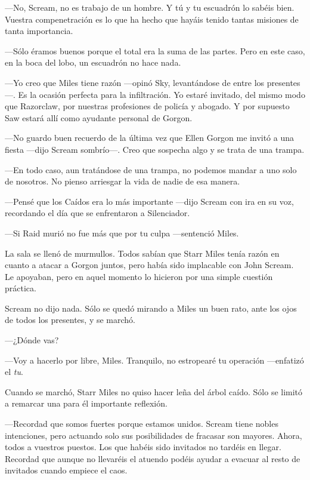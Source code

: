 ---No, Scream, no es trabajo de un hombre. Y tú y tu escuadrón lo sabéis bien. Vuestra compenetración es lo que ha hecho que hayáis tenido tantas misiones de tanta importancia.

---Sólo éramos buenos porque el total era la suma de las partes. Pero en este caso, en la boca del lobo, un escuadrón no hace nada.

---Yo creo que Miles tiene razón ---opinó Sky, levantándose de entre los presentes---. Es la ocasión perfecta para la infiltración. Yo estaré invitado, del mismo modo que Razorclaw, por nuestras profesiones de policía y abogado. Y por supuesto Saw estará allí como ayudante personal de Gorgon.

---No guardo buen recuerdo de la última vez que Ellen Gorgon me invitó a una fiesta ---dijo Scream sombrío---. Creo que sospecha algo y se trata de una trampa.

---En todo caso, aun tratándose de una trampa, no podemos mandar a uno solo de nosotros. No pienso arriesgar la vida de nadie de esa manera.

---Pensé que los Caídos era lo más importante ---dijo Scream con ira en su voz, recordando el día que se enfrentaron a Silenciador.

---Si Raid murió no fue más que por tu culpa ---sentenció Miles.

La sala se llenó de murmullos. Todos sabían que Starr Miles tenía razón en cuanto a atacar a Gorgon juntos, pero había sido implacable con John Scream. Le apoyaban, pero en aquel momento lo hicieron por una simple cuestión práctica.

Scream no dijo nada. Sólo se quedó mirando a Miles un buen rato, ante los ojos de todos los presentes, y se marchó.

---¿Dónde vas?

---Voy a hacerlo por libre, Miles. Tranquilo, no estropearé tu operación ---enfatizó el \emph{tu}.

Cuando se marchó, Starr Miles no quiso hacer leña del árbol caído. Sólo se limitó a remarcar una para él importante reflexión.

---Recordad que somos fuertes porque estamos unidos. Scream tiene nobles intenciones, pero actuando solo sus posibilidades de fracasar son mayores. Ahora, todos a vuestros puestos. Los que habéis sido invitados no tardéis en llegar. Recordad que aunque no llevaréis el atuendo podéis ayudar a evacuar al resto de invitados cuando empiece el caos.

